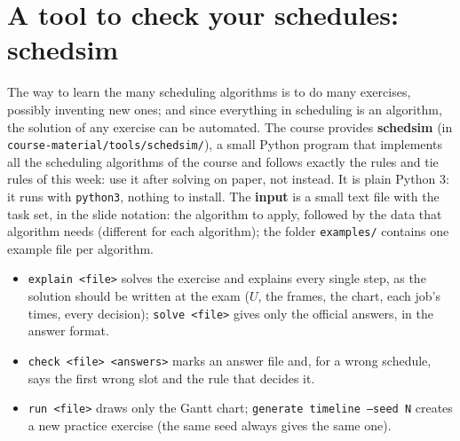 \section{A tool to check your schedules: schedsim}
The way to learn the many scheduling algorithms is to do many exercises, possibly inventing new ones; and since everything in scheduling is an algorithm, the solution of any exercise can be automated. The course provides \textbf{schedsim} (in \texttt{course-material/tools/schedsim/}), a small Python program that implements all the scheduling algorithms of the course and follows exactly the rules and tie rules of this week: use it after solving on paper, not instead. It is plain Python 3: it runs with \texttt{python3}, nothing to install. The \textbf{input} is a small text file with the task set, in the slide notation: the algorithm to apply, followed by the data that algorithm needs (different for each algorithm); the folder \texttt{examples/} contains one example file per algorithm.
\begin{itemize}
    \item \texttt{explain <file>} solves the exercise and explains every single step, as the solution should be written at the exam ($U$, the frames, the chart, each job's times, every decision); \texttt{solve <file>} gives only the official answers, in the answer format.
    \item \texttt{check <file> <answers>} marks an answer file and, for a wrong schedule, says the first wrong slot and the rule that decides it.
    \item \texttt{run <file>} draws only the Gantt chart; \texttt{generate timeline --seed N} creates a new practice exercise (the same seed always gives the same one).
\end{itemize}

